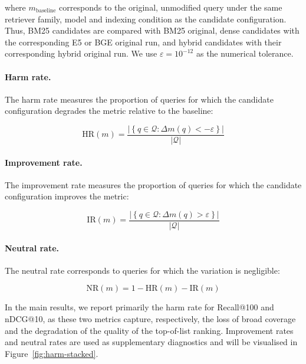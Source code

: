 \documentclass[a4paper,fleqn]{cas-dc}
\begin{document}
where $m_{\text{baseline}}$ corresponds to the
original, unmodified query under the same retriever family,
model and indexing condition as the candidate configuration.
Thus, BM25 candidates are compared with BM25 original,
dense candidates with the corresponding E5 or BGE original
run, and hybrid candidates with their corresponding hybrid
original run. We use $\varepsilon = 10^{-12}$ as the
numerical tolerance.

\paragraph{Harm rate.}
The harm rate measures the proportion of queries
for which the candidate configuration degrades
the metric relative to the baseline:

\begin{equation}
    \text{HR}(m) =
    \frac{\left|\left\{q \in \mathcal{Q} :
    \Delta m(q) < -\varepsilon\right\}\right|}
    {|\mathcal{Q}|}
\end{equation}

\paragraph{Improvement rate.}
The improvement rate measures the proportion of queries
for which the candidate configuration improves
the metric:

\begin{equation}
    \text{IR}(m) =
    \frac{\left|\left\{q \in \mathcal{Q} :
    \Delta m(q) > \varepsilon\right\}\right|}
    {|\mathcal{Q}|}
\end{equation}

\paragraph{Neutral rate.}
The neutral rate corresponds to queries for which the variation
is negligible:

\begin{equation}
    \text{NR}(m) =
    1 - \text{HR}(m) - \text{IR}(m)
\end{equation}

In the main results, we report primarily
the harm rate for Recall@100 and nDCG@10, as these two
metrics capture, respectively, the loss of
broad coverage and the degradation of the quality of
the top-of-list ranking. Improvement rates
and neutral rates are used as supplementary
diagnostics and will be visualised in
Figure~\ref{fig:harm-stacked}.
\end{document}
